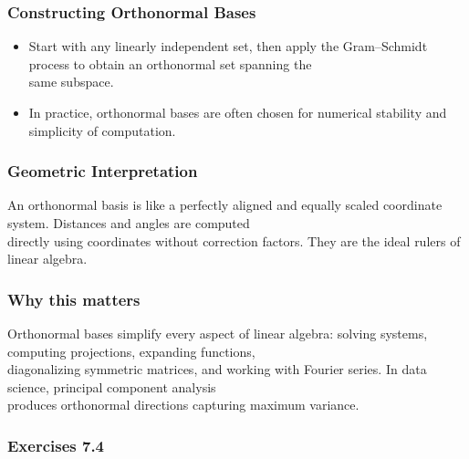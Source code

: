 \documentclass[
  12pt,
  a4paper,
]{article}
\begin{document}
\subsubsection{Constructing Orthonormal
Bases}\label{constructing-orthonormal-bases}

\begin{itemize}
\item
  Start with any linearly independent set, then apply the Gram--Schmidt
  process to obtain an orthonormal set spanning the\\
  same subspace.
\item
  In practice, orthonormal bases are often chosen for numerical
  stability and simplicity of computation.
\end{itemize}

\subsubsection{Geometric
Interpretation}\label{geometric-interpretation-16}

An orthonormal basis is like a perfectly aligned and equally scaled
coordinate system. Distances and angles are computed\\
directly using coordinates without correction factors. They are the
ideal rulers of linear algebra.

\subsubsection{Why this matters}\label{why-this-matters-27}

Orthonormal bases simplify every aspect of linear algebra: solving
systems, computing projections, expanding functions,\\
diagonalizing symmetric matrices, and working with Fourier series. In
data science, principal component analysis\\
produces orthonormal directions capturing maximum variance.

\subsubsection{Exercises 7.4}\label{exercises-74}
\end{document}
